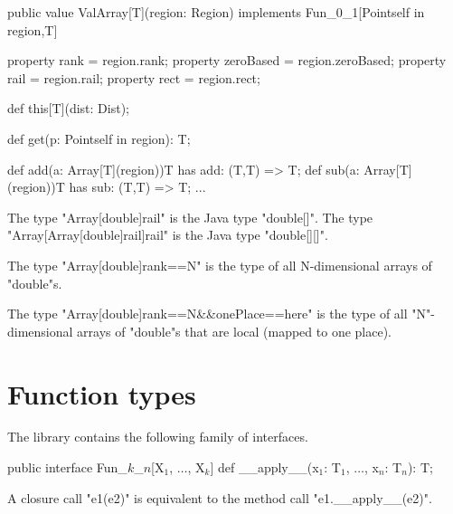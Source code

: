 \begin{xten}
public value ValArray[T](region: Region)
    implements Fun_0_1[Point{self in region},T] {

    property rank = region.rank;
    property zeroBased = region.zeroBased;
    property rail = region.rail;
    property rect = region.rect;

    def this[T](dist: Dist);

    def get(p: Point{self in region}): T;

    def add(a: Array[T](region)){T has add: (T,T) => T};
    def sub(a: Array[T](region)){T has sub: (T,T) => T};
    ...
}
\end{xten}

  The type \xcd"Array[double]{rail}" is the Java type \xcd"double[]".
  The type \xcd"Array[Array[double]{rail}]{rail}" is the Java type \xcd"double[][]".

  The type \xcd"Array[double]{rank==N}" is the type of all N-dimensional arrays of
  \xcd"double"s.

  The type \xcd"Array[double]{rank==N&&onePlace==here}" is the
  type of all \xcd"N"-dimensional
  arrays of \xcd"double"s that are local (mapped to one place).  

\section{Function types}

The library contains the following family of interfaces.

\begin{xtenmath}
public interface Fun_$k$_$n$[X$_1$, $\dots$, X$_k$] {
    def __apply__(x$_1$: T$_1$, $\dots$, x$_n$: T$_n$): T;
}
\end{xtenmath}

A closure call \xcd"e1(e2)" is equivalent to 
the method call \xcd"e1.__apply__(e2)".
